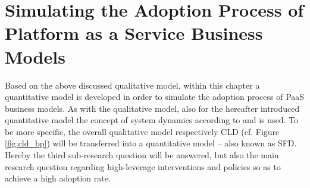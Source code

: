 \chapter{Simulating the Adoption Process of Platform as a Service Business Models}\label{ch:sfd}

\begin{comment}

	\begin{itemize}
		\item additiv oder multiplikativ
		\item annahme: total population = adopters + potentail adopters
	\end{itemize}

	\newpage

	In order to map the values of the function $f(s) \in [a_{1},a_{2}]$ to the desired interval $[b_{1},b_{2}]$, the following generic linear transformation function is used:
	\begin{equation}\label{eq:ltg}
		f(t) = b_{1} + \frac{(s-a_{1})(b_{2}-b_{1})}{(a_{2}-a_{1})} \in [b_{1},b_{2}]
	\end{equation}

	In the particaular case of mapping the function $f(s) \in [0,1]$ to the interval $[0,b_{2}]$, the Formula \ref{eq:ltg} can be simplified as follows:
	\begin{equation}\label{eq:lts}
		f(t) = sb_{2} \in [0,b_{2}].
	\end{equation}

\end{comment}


Based on the above discussed qualitative model, within this chapter a quantitative model is developed in order to simulate the adoption process of \ac{PaaS} business models. As with the qualitative model, also for the hereafter introduced quantitative model the concept of system dynamics according to \citet{Sterman2000} and \citet{Sterman2001} is used. To be more specific, the overall qualitative model respectively \ac{CLD} (cf. Figure \ref{fig:cld_bp}) will be transferred into a quantitative model -- also known as \acf{SFD}. Hereby the third sub-research question will be answered, but also the main research question regarding high-leverage interventions and policies so as to achieve a high adoption rate.

